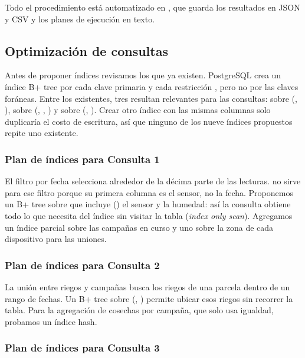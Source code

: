 Todo el procedimiento está automatizado en , que guarda los resultados en JSON y CSV y los planes de ejecución en texto.

\subsection{Optimización de consultas}

Antes de proponer índices revisamos los que ya existen. PostgreSQL crea un índice B+ tree por cada clave primaria y cada restricción , pero no por las claves foráneas. Entre los existentes, tres resultan relevantes para las consultas:  sobre (, ),  sobre (, , ) y  sobre (, ). Crear otro índice con las mismas columnas solo duplicaría el costo de escritura, así que ninguno de los nueve índices propuestos repite uno existente.

\subsubsection{Plan de índices para Consulta 1}

El filtro por fecha selecciona alrededor de la décima parte de las lecturas.  no sirve para ese filtro porque su primera columna es el sensor, no la fecha. Proponemos un B+ tree sobre  que incluye () el sensor y la humedad: así la consulta obtiene todo lo que necesita del índice sin visitar la tabla (\emph{index only scan}). Agregamos un índice parcial sobre las campañas en curso y uno sobre la zona de cada dispositivo para las uniones.


\subsubsection{Plan de índices para Consulta 2}

La unión entre riegos y campañas busca los riegos de una parcela dentro de un rango de fechas. Un B+ tree sobre (, ) permite ubicar esos riegos sin recorrer la tabla. Para la agregación de cosechas por campaña, que solo usa igualdad, probamos un índice hash.


\subsubsection{Plan de índices para Consulta 3}

